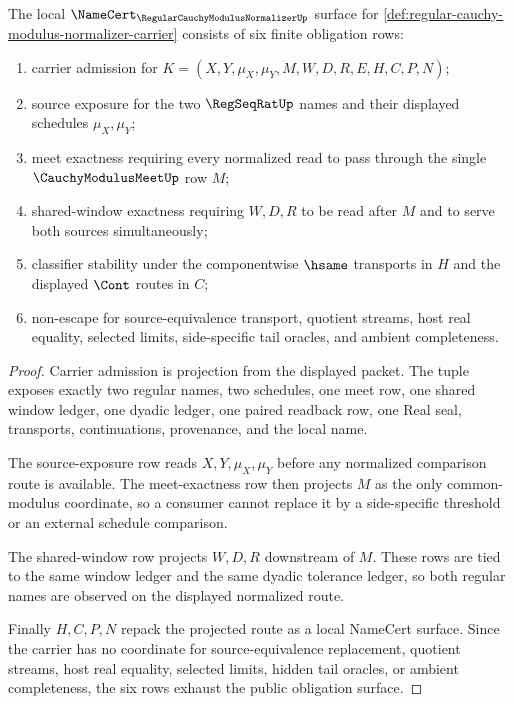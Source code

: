 \begin{theorem}
\label{thm:regular-cauchy-modulus-normalizer-namecert-obligations}
The local $\NameCert_{\RegularCauchyModulusNormalizerUp}$ surface for \autoref{def:regular-cauchy-modulus-normalizer-carrier} consists of six finite obligation rows:
\begin{enumerate}
\item carrier admission for $K=(X,Y,\mu_X,\mu_Y,M,W,D,R,E,H,C,P,N)$;
\item source exposure for the two $\RegSeqRatUp$ names and their displayed schedules $\mu_X,\mu_Y$;
\item meet exactness requiring every normalized read to pass through the single $\CauchyModulusMeetUp$ row $M$;
\item shared-window exactness requiring $W,D,R$ to be read after $M$ and to serve both sources simultaneously;
\item classifier stability under the componentwise $\hsame$ transports in $H$ and the displayed $\Cont$ routes in $C$;
\item non-escape for source-equivalence transport, quotient streams, host real equality, selected limits, side-specific tail oracles, and ambient completeness.
\end{enumerate}
\end{theorem}
\begin{proof}
Carrier admission is projection from the displayed packet. The tuple exposes exactly two regular names, two schedules, one meet row, one shared window ledger, one dyadic ledger, one paired readback row, one Real seal, transports, continuations, provenance, and the local name.

The source-exposure row reads $X,Y,\mu_X,\mu_Y$ before any normalized comparison route is available. The meet-exactness row then projects $M$ as the only common-modulus coordinate, so a consumer cannot replace it by a side-specific threshold or an external schedule comparison.

The shared-window row projects $W,D,R$ downstream of $M$. These rows are tied to the same window ledger and the same dyadic tolerance ledger, so both regular names are observed on the displayed normalized route.

Finally $H,C,P,N$ repack the projected route as a local NameCert surface. Since the carrier has no coordinate for source-equivalence replacement, quotient streams, host real equality, selected limits, hidden tail oracles, or ambient completeness, the six rows exhaust the public obligation surface.
\end{proof}

